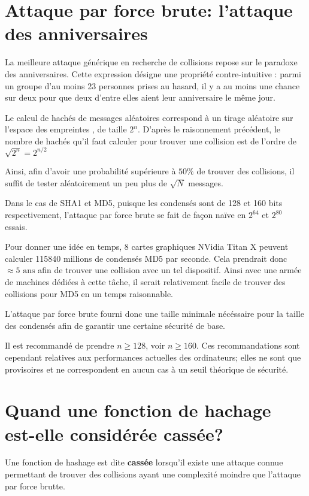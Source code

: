 \documentclass[10.5pt, a4paper, twoside, openright]{report}
\begin{document}
\section{Attaque par force brute: l’attaque des anniversaires}
La meilleure attaque générique en recherche de collisions repose sur le paradoxe des anniversaires. Cette expression désigne une propriété contre-intuitive : parmi un groupe d’au moins 23 personnes prises au hasard, il y a au moins une chance sur deux pour que deux d’entre elles aient leur anniversaire le même jour. 

Le calcul de hachés de messages aléatoires correspond à un tirage aléatoire sur l’espace des empreintes , de taille $2^n$. D’après le raisonnement précédent, le nombre de hachés qu’il faut calculer pour trouver une collision est de l’ordre de $\sqrt{2^n} = 2^{n/2}$


Ainsi, afin d'avoir une probabilité supérieure à $50\%$ de trouver des collisions, il suffit de tester aléatoirement un peu plus de $\sqrt{N}$ messages.

Dans le cas de SHA1 et MD5, puisque les condensés sont de 128 et 160 bits respectivement, l'attaque par force brute se fait de façon naïve en $2^{64}$ et $2^{80}$ essais.

Pour donner une idée en temps, 8 cartes graphiques NVidia Titan X peuvent calculer 115840 millions de condensés MD5 par seconde. Cela prendrait donc $ \approx 5 \mbox{ ans}$ afin de trouver une collision avec un tel dispositif.
Ainsi avec une armée de machines dédiées à cette tâche, il serait relativement facile de trouver des collisions pour MD5 en un temps raisonnable.

L'attaque par force brute fourni donc une taille minimale nécéssaire pour la taille des condensés afin de garantir une certaine sécurité de base.

Il est recommandé de prendre $n \ge 128$, voir $n\ge 160$. Ces recommandations sont cependant relatives aux performances actuelles des ordinateurs; elles ne sont que provisoires et ne correspondent en aucun cas à un seuil théorique de sécurité.

\section{Quand une fonction de hachage est-elle considérée cassée?}
Une fonction de hashage est dite \textbf{cassée} lorsqu'il existe une attaque connue permettant de trouver des collisions ayant une complexité moindre que l'attaque par force brutte. 
\end{document}
